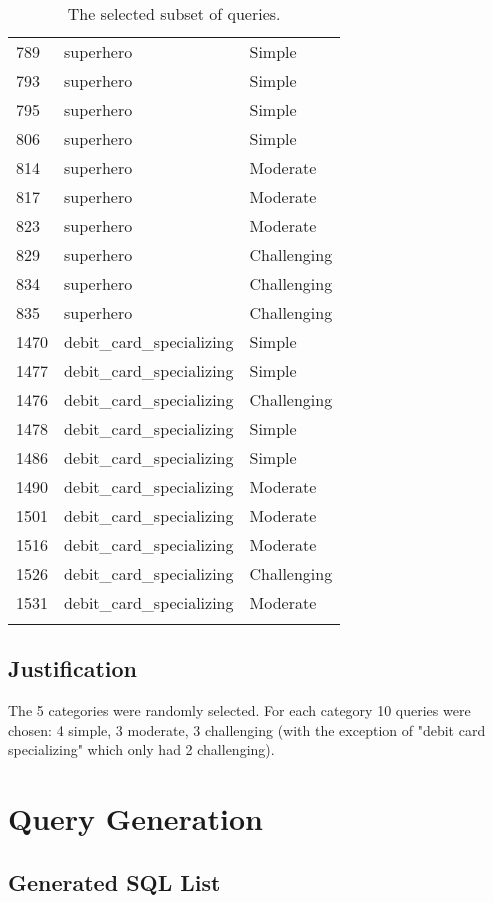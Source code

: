 \documentclass[11pt]{article}
\begin{document}
\begin{longtable}{l l l}
789  & superhero            & Simple \\
793  & superhero            & Simple \\
795  & superhero            & Simple \\
806  & superhero            & Simple \\
814  & superhero            & Moderate \\
817  & superhero            & Moderate \\
823  & superhero            & Moderate \\
829  & superhero            & Challenging \\
834  & superhero            & Challenging \\
835  & superhero            & Challenging \\
1470 & debit\_card\_specializing & Simple \\
1477 & debit\_card\_specializing & Simple \\
1476 & debit\_card\_specializing & Challenging \\
1478 & debit\_card\_specializing & Simple \\
1486 & debit\_card\_specializing & Simple \\
1490 & debit\_card\_specializing & Moderate \\
1501 & debit\_card\_specializing & Moderate \\
1516 & debit\_card\_specializing & Moderate \\
1526 & debit\_card\_specializing & Challenging \\
1531 & debit\_card\_specializing & Moderate \\
\bottomrule
\caption{The selected subset of queries.}
\end{longtable}

\subsection{Justification}
The 5 categories were randomly selected. For each category 10 queries were chosen: 4 simple, 3 moderate, 3 challenging (with the exception of "debit card specializing" which only had 2 challenging).

\section{Query Generation}
\subsection{Generated SQL List}
\end{document}
